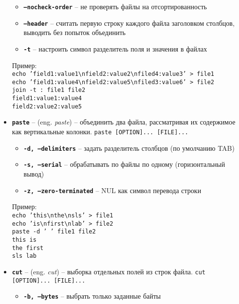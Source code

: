 \documentclass[12pt, a4paper]{article}
\begin{document}
\begin{itemize}
\begin{itemize}
    \item \textbf{\texttt{--nocheck-order}} -- не проверять файлы на
      отсортированность
    \item \textbf{\texttt{--header}} -- считать первую строку каждого файла
      заголовком столбцов, выводить без попыток объединить
    \item \textbf{\texttt{-t}} -- настроить символ разделитель поля и значения
      в файлах
  \end{itemize}
  Пример:\\
  \texttt{echo 'field1:value1\backslash nfield2:value2\backslash nfiled4:value3' > file1}\\
  \texttt{echo 'field1:value4\backslash nfield2:value5\backslash nfiled3:value6' > file2}\\
  \texttt{join -t : file1 file2}\\
  \texttt{field1:value1:value4}\\
  \texttt{field2:value2:value5}\\
  \item \textbf{\texttt{paste}} -- (eng. \textit{paste}) -- объединить два
    файла, рассматривая их содержимое как вертикальные колонки.
    \texttt{paste [OPTION]... [FILE]...}
  \begin{itemize}
    \item \textbf{\texttt{-d, --delimiters}} -- задать разделитель столбцов
      (по умолчанию TAB)
    \item \textbf{\texttt{-s, --serial}} -- обрабатывать по файлы по одному
      (горизонтальный вывод)
    \item \textbf{\texttt{-z, --zero-terminated}} -- NUL как символ перевода
      строки
  \end{itemize}
  Пример:\\
  \texttt{echo 'this\backslash nthe\backslash nsls' > file1}\\
  \texttt{echo 'is\backslash nfirst\backslash nlab' > file2}\\
  \texttt{paste -d ' ' file1 file2}\\
  \texttt{this is}\\
  \texttt{the first}\\
  \texttt{sls lab}\\
  \item \textbf{\texttt{cut}} -- (eng. \textit{cut}) -- выборка отдельных
    полей из строк файла. \texttt{cut [OPTION]... [FILE]...}
  \begin{itemize}
    \item \textbf{\texttt{-b, --bytes}} -- выбрать только заданные байты

\end{itemize}
\end{itemize}
\end{document}
